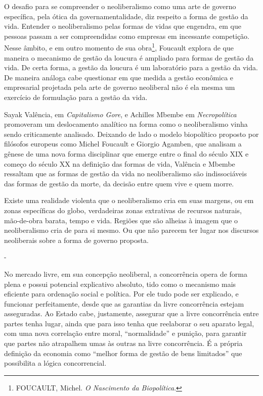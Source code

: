 O desafio para se compreender o neoliberalismo como uma arte de governo
específica, pela ótica da governamentalidade, diz respeito a forma de
gestão da vida. Entender o neoliberalismo pelas formas de vidas que
engendra, em que pessoas passam a ser compreendidas como empresas em
incessante competição. Nesse âmbito, e em outro momento de sua
obra\footnote{FOUCAULT, Michel. \emph{O Nascimento da Biopolítica}.},
Foucault explora de que maneira o mecanismo de gestão da loucura é
ampliado para formas de gestão da vida. De certa forma, a gestão da
loucura é um laboratório para a gestão da vida. De maneira análoga cabe
questionar em que medida a gestão econômica e empresarial projetada pela
arte de governo neoliberal não é ela mesma um exercício de formulação
para a gestão da vida.

Sayak Valência, em \emph{Capitalismo Gore}, e Achilles Mbembe em
\emph{Necropolítica} promoveram um deslocamento analítico na forma como
o neoliberalismo vinha sendo criticamente analisado. Deixando de lado o
modelo biopolítico proposto por filósofos europeus como Michel Foucault
e Giorgio Agamben, que analisam a gênese de uma nova forma disciplinar
que emerge entre o final do século XIX e começo do século XX na
definição das formas de vida, Valência e Mbembe ressaltam que as formas
de gestão da vida no neoliberalismo são indissociáveis das formas de
gestão da morte, da decisão entre quem vive e quem morre.

Existe uma realidade violenta que o neoliberalismo cria em suas margens,
ou em zonas específicas do globo, verdadeiras zonas extrativas de
recursos naturais, mão-de-obra barata, tempo e vida. Regiões que são
alheias à imagem que o neoliberalismo cria de para si mesmo. Ou que não
parecem ter lugar nos discursos neoliberais sobre a forma de governo
proposta.

-

No mercado livre, em sua concepção neoliberal, a concorrência opera de
forma plena e possui potencial explicativo absoluto, tido como o
mecanismo mais eficiente para ordenação social e política. Por ele tudo
pode ser explicado, e funcionar perfeitamente, desde que as garantias da
livre concorrência estejam asseguradas. Ao Estado cabe, justamente,
assegurar que a livre concorrência entre partes tenha lugar, ainda que
para isso tenha que reelaborar o seu aparato legal, com uma nova
correlação entre moral, ``normalidade'' e punição, para garantir que
partes não atrapalhem umas às outras na livre concorrência. É a própria
definição da economia como ``melhor forma de gestão de bens limitados''
que possibilita a lógica concorrencial.

